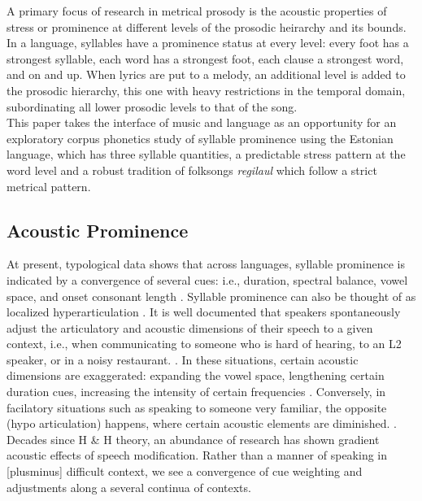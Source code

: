 \documentclass[11pt]{article}
\begin{document}
A primary focus of research in metrical prosody is the acoustic properties of stress or prominence at different levels of the prosodic heirarchy and its bounds. In a language, syllables have a prominence status at every level: every foot has a strongest syllable, each word has a strongest foot, each clause a strongest word, and on and up. When lyrics are put to a melody, an additional level is added to the prosodic hierarchy, this one with heavy restrictions in the temporal domain, subordinating all lower prosodic levels to that of the song. \\

This paper takes the interface of music and language as an opportunity for an exploratory corpus phonetics study of syllable prominence using the Estonian language, which has three syllable quantities, a predictable stress pattern at the word level and a robust tradition of folksongs {\it regilaul} which follow a strict metrical pattern. \\

\subsection*{Acoustic Prominence} 
 
 At present, typological data shows that across languages, syllable prominence is indicated by a convergence of several cues: i.e.,  duration, spectral balance, vowel space, and onset consonant length \cite{sluijterSpectralBalanceAcoustic1996,gordonPHONETICCORRELATESSTRESS1997, libermanStressLinguisticRhythm1977,berinsteinWPPNo471979,dejongStressLexicalFocus2004}.
Syllable prominence can also be thought of as localized hyperarticulation \cite{dejongSupraglottalArticulationProminence1995}. It is well documented that speakers spontaneously adjust the articulatory and acoustic dimensions of their speech to a given context, i.e., when communicating to someone who is hard of hearing, to an L2 speaker, or in a noisy restaurant. \cite{smiljanicbradlow}. In these situations, certain acoustic dimensions are exaggerated: expanding the vowel space, lengthening certain duration cues, increasing the intensity of certain frequencies \cite{}. Conversely, in facilatory situations such as speaking to someone very familiar, the opposite (hypo articulation) happens, where certain acoustic elements are diminished. \cite{lindblomExplainingPhoneticVariation1990}. Decades since H \& H theory, an abundance of research has shown gradient acoustic effects of speech modification. Rather than a manner of speaking in [plusminus] difficult context, we see a convergence of cue weighting and adjustments along a several continua of contexts.  \\
 
\end{document}
